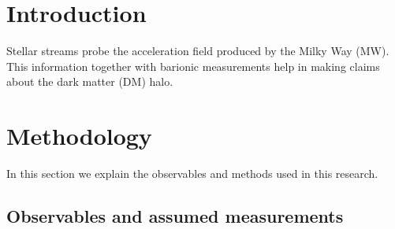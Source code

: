 \documentclass[twocolumn]{aa}
\begin{document}
   \maketitle

\section{Introduction}

Stellar streams probe the acceleration field produced by the Milky Way (MW).
This information together with barionic measurements help in making claims about the
dark matter (DM) halo.

\section{Methodology}
In this section we explain the observables and methods used in this research.

\subsection{Observables and assumed measurements}
\label{sec:observables}
\end{document}
